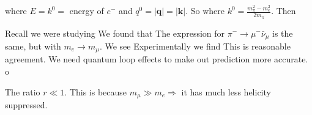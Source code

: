 \documentclass{article}
\begin{document}
where $E = k^0 =$ energy of $e^-$ and $q^0 = |\bm{q}| = |\bm{k}|$. So 
where $k^0 = \frac{m_\pi^2 - m_e^2}{2m_\pi}$. Then 

Recall we were studying 
We found that 
The expression for $\pi^- \to \mu^- \bar{\nu}_\mu$ is the same, but with $m_e \to m_\mu$. We see 
Experimentally we find 
This is reasonable agreement. We need quantum loop effects to make out prediction more accurate. o
\begin{remark}
The ratio $r \ll 1$. This is because $m_\mu \gg m_e \Rightarrow$ it has much less helicity suppressed.
\end{remark}


\end{document}
